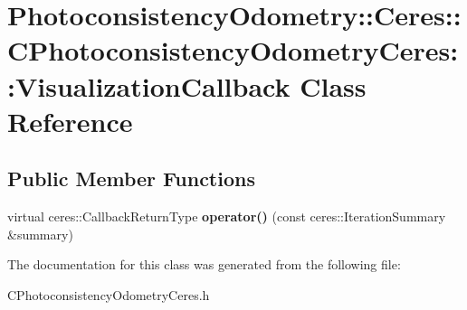 \hypertarget{class_photoconsistency_odometry_1_1_ceres_1_1_c_photoconsistency_odometry_ceres_1_1_visualization_callback}{
\section{PhotoconsistencyOdometry::Ceres::CPhotoconsistencyOdometryCeres::VisualizationCallback Class Reference}
\label{class_photoconsistency_odometry_1_1_ceres_1_1_c_photoconsistency_odometry_ceres_1_1_visualization_callback}
}
\subsection*{Public Member Functions}
\begin{DoxyCompactItemize}
\item 
\hypertarget{class_photoconsistency_odometry_1_1_ceres_1_1_c_photoconsistency_odometry_ceres_1_1_visualization_callback_a6b6ca449fe52592c14d9160e1228d2e5}{
virtual ceres::CallbackReturnType {\bfseries operator()} (const ceres::IterationSummary \&summary)}
\label{class_photoconsistency_odometry_1_1_ceres_1_1_c_photoconsistency_odometry_ceres_1_1_visualization_callback_a6b6ca449fe52592c14d9160e1228d2e5}

\end{DoxyCompactItemize}


The documentation for this class was generated from the following file:\begin{DoxyCompactItemize}
\item 
CPhotoconsistencyOdometryCeres.h\end{DoxyCompactItemize}
